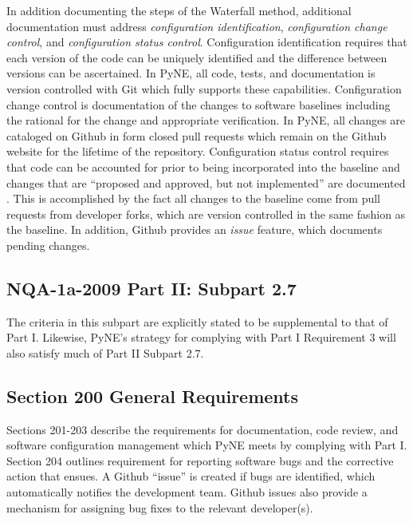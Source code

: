 \documentclass{anstrans}
\begin{document}
In addition documenting the steps of the Waterfall method, additional
documentation must address \emph{configuration identification}, \emph{configuration change
control}, and \emph{configuration status control}. Configuration identification
requires that each version of the code can be uniquely identified and the
difference between versions can be ascertained. In PyNE, all code, tests, and
documentation is version controlled with Git which fully supports these
capabilities. Configuration change control is documentation of the changes to
software baselines including the rational for the change and appropriate
verification. In PyNE, all changes are cataloged on Github in form closed pull
requests which remain on the Github website for the lifetime of the repository.
Configuration status control requires that code can be accounted for prior to
being incorporated into the baseline and changes that are ``proposed and approved,
but not implemented'' are documented \cite{add}. This is accomplished by the fact all
changes to the baseline come from pull requests from developer forks, which are
version controlled in the same fashion as the baseline. In addition, Github
provides an \emph{issue} feature, which documents pending changes.


\subsection{NQA-1a-2009 Part II: Subpart 2.7}

The criteria in this subpart are explicitly stated to be supplemental to that
of Part I. Likewise, PyNE's strategy for complying with Part I Requirement 3 will also satisfy much of Part II Subpart 2.7.

\subsection{Section 200 General Requirements}

Sections 201-203 describe the requirements for documentation, code review, and
software configuration management which PyNE meets by complying with Part I.
Section 204 outlines requirement for reporting software bugs and the corrective
action that ensues. A Github ``issue'' is created if bugs are identified, which
automatically notifies the development team. Github
issues also provide a mechanism for assigning bug fixes to the relevant
developer(s). 

\end{document}
